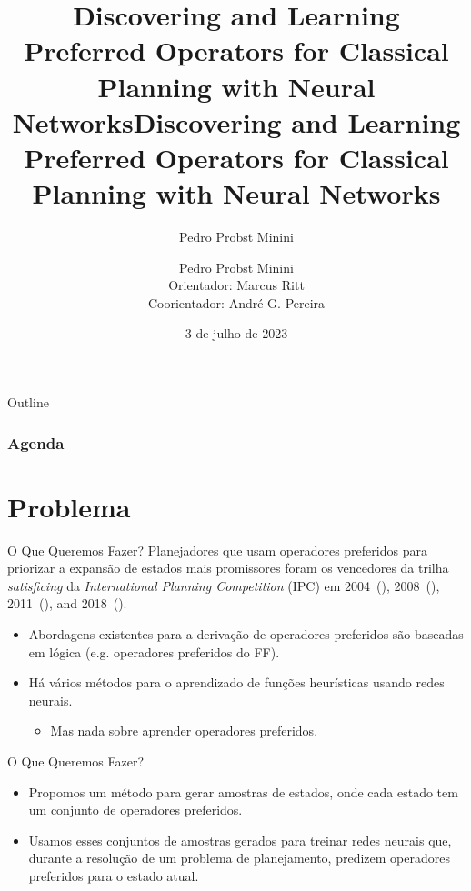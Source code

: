\documentclass{beamer}
\title[Discovering and Learning Preferred Operators]{Discovering and Learning Preferred Operators for Classical Planning with Neural Networks}
\author{Pedro Probst Minini}
\title[Discovering and Learning Preferred Operators]
      {Discovering and Learning Preferred Operators for Classical Planning with Neural Networks}
\date{3 de julho de 2023}
\author{Pedro Probst Minini \\ \vspace{0.3cm} Orientador: Marcus Ritt \\ Coorientador: André G. Pereira}
\institute{Instituto de Informática --- UFRGS}
\begin{document}

\begin{frame}[plain]
  \titlepage
\end{frame}

\begin{frame}{Outline}
  \frametitle{Agenda}
  \tableofcontents
\end{frame}

\section{Problema}
\begin{frame}{O Que Queremos Fazer?}
Planejadores que usam operadores preferidos para \alert{priorizar a expansão de estados mais promissores} foram os vencedores da trilha \emph{satisficing} da \emph{International Planning Competition} (IPC) em \alert{2004}~(\cite{Helmert/2006}), \alert{2008}~(\cite{Richter.lama.etal/2010}), \alert{2011}~(\cite{Richter.lama.etal/2011}), and \alert{2018}~(\cite{Seipp-fast.etal/2018}).

\pause
\begin{itemize}
  \item Abordagens existentes para a derivação de operadores preferidos são baseadas em lógica (e.g. operadores preferidos do FF).
  \pause
  \item Há vários métodos para o \alert{aprendizado de funções heurísticas} usando redes neurais.
  \begin{itemize}
    \item Mas nada sobre aprender operadores preferidos.
  \end{itemize}
\end{itemize}
\end{frame}

\begin{frame}{O Que Queremos Fazer?}
\begin{itemize}
  \item Propomos um método para gerar amostras de estados, onde \alert{cada estado tem um conjunto de operadores preferidos}.
  \pause
  \item Usamos esses conjuntos de amostras gerados para \alert{treinar redes neurais} que, durante a resolução de um problema de planejamento, predizem operadores preferidos para o estado atual.
\end{itemize}
\end{frame}
\end{document}
